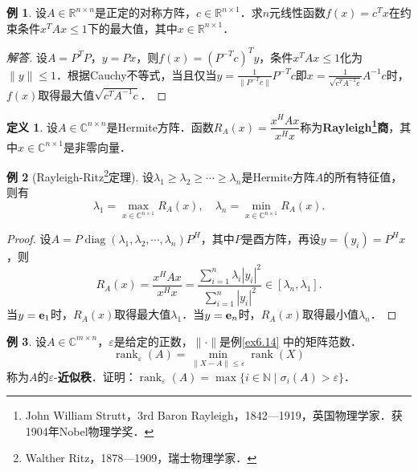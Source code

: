 \documentclass[a4paper,fontset=windows]{ctexbook}
\theoremstyle{definition}
\newtheorem{definition}{定义}[chapter]
\newtheorem{example}{例}[chapter]
\DeclareMathOperator{\diag}{diag}
\DeclareMathOperator{\rank}{rank}
\renewcommand{\le}{\leqslant}
\renewcommand{\ge}{\geqslant}
\begin{document}
\begin{example}
设$A\in\mathbb{R}^{n\times n}$是正定的对称方阵，$c\in\mathbb{R}^{n\times 1}$．求$n$元线性函数$f(x)=c^Tx$在约束条件$x^TAx\le 1$下的最大值，其中$x\in\mathbb{R}^{n\times 1}$．
\end{example}

\begin{proof}[解答]
设$A=P^TP$，$y=Px$，则$f(x)=(P^{-T}c)^Ty$，条件$x^TAx\le 1$化为$\|y\|\le 1$．根据Cauchy不等式，当且仅当$y=\frac{1}{\|P^{-T}c\|}P^{-T}c$即$x=\frac{1}{\sqrt{c^TA^{-1}c}}A^{-1}c$时，$f(x)$取得最大值$\sqrt{c^TA^{-1}c}$．
\end{proof}

\begin{definition}
设$A\in\mathbb{C}^{n\times n}$是Hermite方阵．函数$R_A(x)=\dfrac{x^HAx}{x^Hx}$称为{\bf Rayleigh\footnote{John William Strutt，3rd Baron Rayleigh，1842—1919，英国物理学家．获1904年Nobel物理学奖．}商}，其中$x\in\mathbb{C}^{n\times 1}$是非零向量．
\end{definition}

\begin{example}[Rayleigh-Ritz\footnote{Walther Ritz，1878—1909，瑞士物理学家．}定理]
设$\lambda_1\ge\lambda_2\ge\cdots\ge\lambda_n$是Hermite方阵$A$的所有特征值，则有
$$\lambda_1=\max_{x\in\mathbb{C}^{n\times 1}}R_A(x),\quad
\lambda_n=\min_{x\in\mathbb{C}^{n\times 1}}R_A(x).$$
\end{example}

\begin{proof}
设$A=P\diag(\lambda_1,\lambda_2,\cdots,\lambda_n)P^H$，其中$P$是酉方阵，再设$y=(y_i)=P^Hx$，则
$$R_A(x)=\frac{x^HAx}{x^Hx}=\frac{\sum\limits_{i=1}^n\lambda_i|y_i|^2}{\sum\limits_{i=1}^n|y_i|^2}\in[\lambda_n,\lambda_1].$$
当$y={\bf e}_1$时，$R_A(x)$取得最大值$\lambda_1$．当$y={\bf e}_n$时，$R_A(x)$取得最小值$\lambda_n$．
\end{proof}

\begin{example}
设$A\in\mathbb{C}^{m\times n}$，$\varepsilon$是给定的正数，$\|\cdot\|$是例\ref{ex6.14} 中的矩阵范数．
$$\rank_\varepsilon(A)=\min\limits_{\|X-A\|\le\varepsilon}\rank(X)$$
称为$A$的$\varepsilon$-{\bf 近似秩}．证明：$\rank_\varepsilon(A)=\max\{i\in\mathbb{N}\mid\sigma_i(A)>\varepsilon\}$．
\end{example}
\end{document}
